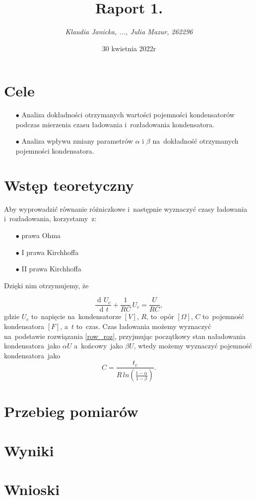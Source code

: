 \documentclass[12pt]{mwart}
\title{\textbf{Raport 1.}}
\author{\fontsize{12pt}{12pt}\selectfont \emph{Klaudia Janicka, ..., Julia Mazur, 262296}}
\date{30 kwietnia 2022r}
\DeclareMathOperator{\diff}{d\!}
\begin{document}
	\maketitle
	\section{Cele}
	\begin{itemize}
		\item[$\bullet$] Analiza dokładności otrzymanych wartości pojemności kondensatorów podczas mierzenia czasu ładowania i~rozładowania kondensatora.
		\item[$\bullet$] Analiza wpływu zmiany parametrów $\alpha$ i $\beta$ na~dokładność otrzymanych pojemności kondensatora.
	\end{itemize}
	\section{Wstęp teoretyczny}
	\noindent Aby wyprowadzić równanie różniczkowe i~następnie wyznaczyć czasy ładowania i~rozładowania, korzystamy~z:
	\begin{itemize}
		\item[$\bullet$] prawa Ohma
		\item[$\bullet$] I prawa Kirchhoffa
		\item[$\bullet$] II prawa Kirchhoffa
	\end{itemize}
	Dzięki nim otrzymujemy, że 
	
	\begin{equation}\label{row_roz}
		\frac{\diff U_{c}}{\diff t} +\frac{1}{RC}\, U_{c}=\frac{U}{RC},
	\end{equation}
	gdzie $U_{c}$ to~napięcie na~kondensatorze $\left[V\right]$, $R$, to~opór $\left[\Omega\right]$, $C$ to~pojemność kondensatora $\left[F\right]$, a~$t$ to~czas.
	Czas ładowania możemy wyznaczyć na~podstawie rozwiązania \ref{row_roz}, przyjmując początkowy stan naładowania kondensatora~jako $\alpha U$ a~końcowy~jako $\beta U$, wtedy możemy wyznaczyć pojemność kondensatora~jako $$C=\frac{t_{c}}{R\,ln\left(\frac{1-\alpha}{1-\beta}\right)}.$$\label{poj}
	\section{Przebieg pomiarów}
	\section{Wyniki}
	\section{Wnioski}
\end{document}

